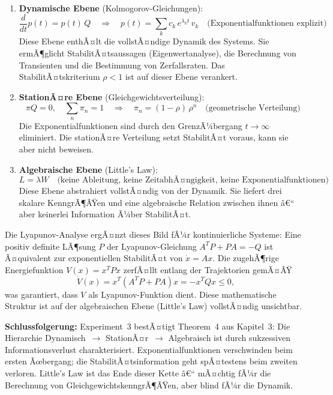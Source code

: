 ﻿\documentclass[a4paper,12pt]{report}
\theoremstyle{definition}
\begin{document}
\begin{enumerate}
	\item \textbf{Dynamische Ebene} (Kolmogorov-Gleichungen):
	\[
	\frac{d}{dt}p(t) = p(t)\,Q
	\quad\Rightarrow\quad
	p(t) = \sum_k c_k\,e^{\lambda_k t}\,v_k
	\quad\text{(Exponentialfunktionen explizit)}
	\]
	Diese Ebene enthÃ¤lt die vollstÃ¤ndige Dynamik des Systems.
	Sie ermÃ¶glicht StabilitÃ¤tsaussagen (Eigenwertanalyse),
	die Berechnung von Transienten und die Bestimmung von
	Zerfallsraten.  Das StabilitÃ¤tskriterium $\rho < 1$ ist auf
	dieser Ebene verankert.
	
	\item \textbf{StationÃ¤re Ebene} (Gleichgewichtsverteilung):
	\[
	\pi Q = 0, \quad \sum_n \pi_n = 1
	\quad\Rightarrow\quad
	\pi_n = (1-\rho)\,\rho^n
	\quad\text{(geometrische Verteilung)}
	\]
	Die Exponentialfunktionen sind durch den GrenzÃ¼bergang
	$t \to \infty$ eliminiert.  Die stationÃ¤re Verteilung setzt
	StabilitÃ¤t voraus, kann sie aber nicht beweisen.
	
	\item \textbf{Algebraische Ebene} (Little's Law):
	\[
	L = \lambda W
	\quad\text{(keine Ableitung, keine ZeitabhÃ¤ngigkeit,
		keine Exponentialfunktionen)}
	\]
	Diese Ebene abstrahiert vollstÃ¤ndig von der Dynamik.  Sie
	liefert drei skalare KenngrÃ¶ÃŸen und eine algebraische
	Relation zwischen ihnen â€“ aber keinerlei Information Ã¼ber
	StabilitÃ¤t.
	
\end{enumerate}

Die Lyapunov-Analyse ergÃ¤nzt dieses Bild fÃ¼r kontinuierliche Systeme:
Eine positiv definite LÃ¶sung $P$ der Lyapunov-Gleichung
$A^T P + PA = -Q$ ist Ã¤quivalent zur exponentiellen StabilitÃ¤t von
$\dot{x} = Ax$.  Die zugehÃ¶rige Energiefunktion $V(x) = x^T P x$
zerfÃ¤llt entlang der Trajektorien gemÃ¤ÃŸ
\[
\dot{V}(x) = x^T(A^T P + PA)x = -x^T Q x \leq 0,
\]
was garantiert, dass $V$ als Lyapunov-Funktion dient.  Diese
mathematische Struktur ist auf der algebraischen Ebene (Little's Law)
vollstÃ¤ndig unsichtbar.

\textbf{Schlussfolgerung:} Experiment~3 bestÃ¤tigt Theorem~4 aus
Kapitel~3: Die Hierarchie Dynamisch~$\to$ StationÃ¤r~$\to$ Algebraisch
ist durch sukzessiven Informationsverlust charakterisiert.
Exponentialfunktionen verschwinden beim ersten Ãœbergang; die
StabilitÃ¤tsinformation geht spÃ¤testens beim zweiten verloren.
Little's Law ist das Ende dieser Kette â€“ mÃ¤chtig fÃ¼r die Berechnung
von GleichgewichtskenngrÃ¶ÃŸen, aber blind fÃ¼r die Dynamik.
\end{document}
